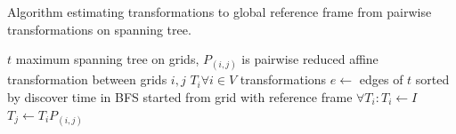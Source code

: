 \begin{algorithm}
    \caption{Algorithm estimating transformations to global reference frame from pairwise transformations on spanning tree.}
    \label{alg:estimatefinaltrans}
    \begin{algorithmic}[1]
        \Require $t$ maximum spanning tree on grids, $P_{(i,j)}$ is pairwise reduced affine transformation between grids $i, j$
        \Ensure $T_i \forall i \in V$ transformations
            \State $e \gets$ edges of $t$ sorted by discover time in \gls{BFS} started from grid with reference frame 
            \State $\forall T_i: T_i \gets I$ 
                $T_j \gets T_i P_{(i,j)}$
            \EndFor
        \EndProcedure
    \end{algorithmic}
\end{algorithm}

